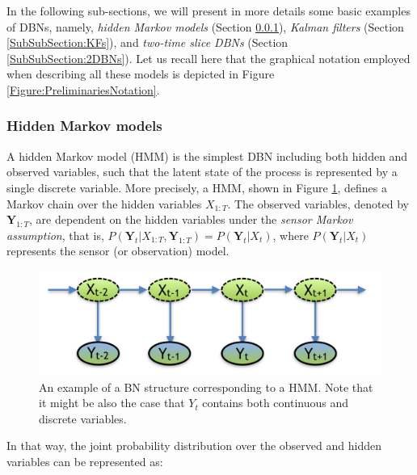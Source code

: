 In the following sub-sections, we will present in more details some basic examples of DBNs, namely, \textit{hidden Markov models} (Section \ref{SubSubSection:HMMs}), \textit{Kalman filters} (Section \ref{SubSubSection:KFs}), and \textit{two-time slice DBNs} (Section \ref{SubSubSection:2DBNs}). Let us recall here that the graphical notation employed when describing all these models is depicted in Figure \ref{Figure:PreliminariesNotation}.

\subsubsection{Hidden Markov models}\label{SubSubSection:HMMs}

A hidden Markov model (HMM) is the simplest DBN including both hidden and observed variables, such that the latent state of the process is represented by a single discrete variable. More precisely, a HMM, shown in Figure \ref{Figure:HMM}, defines a Markov chain over the hidden variables $X_{1:T}$. The observed variables, denoted by $\bm Y_{1:T}$, are dependent on the hidden variables under the \textit{sensor Markov assumption}, that is, $P(\bm Y_t| X_{1:T}, \bm Y_{1:T}) = P(\bm Y_t| X_t)$, where $P(\bm Y_t| X_t)$ represents the sensor (or observation) model.  

\begin{figure}[ht!]
\begin{center}
\includegraphics[scale=0.4]{./figures/PreliminariesHMM}
\caption{\label{Figure:HMM}An example of a BN structure corresponding to a HMM. Note that it might be also the case that $Y_t$ contains both continuous and discrete variables.}
\end{center}
\end{figure}

In that way, the joint probability distribution over the observed and hidden variables can be represented as:

